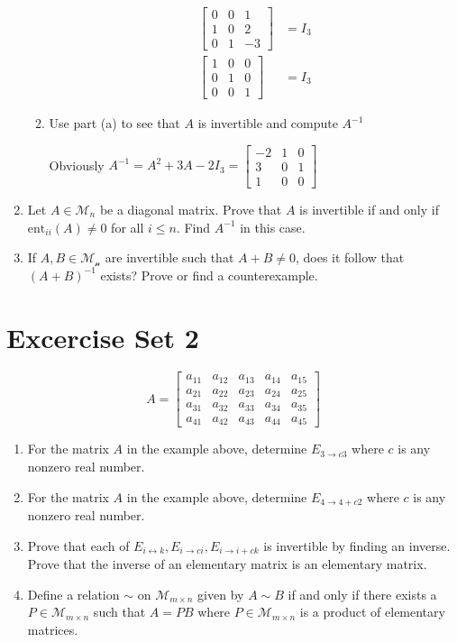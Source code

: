 \documentclass[letterpaper]{article}
\begin{document}
\begin{enumerate}
\begin{enumerate}
\begin{align*}
    \left[\begin{array}{ccc}0&0&1\\1&0&2\\0&1&-3\end{array}\right]&=I_3\\
    \left[\begin{array}{ccc}1&0&0\\0&1&0\\0&0&1\end{array}\right]&=I_3
  \end{align*}
  \item
  Use part (a) to see that $A$ is invertible and compute $A^{-1}$
  
  Obviously $A^{-1}=A^2+3A-2I_3=\left[\begin{array}{ccc}-2&1&0\\3&0&1\\1&0&0\end{array}\right]$
  \end{enumerate}
\item
Let $A\in \mathcal{M}_n$ be a diagonal matrix. Prove that $A$ is invertible if and only if $\text{ent}_{ii}(A)\ne0$ for all $i\le n$. Find $A^{-1}$ in this case.
\item
If $A,B\in \mathcal{M_n}$ are invertible such that $A+B\ne 0$, does it follow that $(A+B)^{-1}$ exists? Prove or find a counterexample.
\end{enumerate}
\section*{Excercise Set 2}

\[A=
\left[\begin{array}{ccccc}
  a_{11}&a_{12}&a_{13}&a_{14}&a_{15}\\
  a_{21}&a_{22}&a_{23}&a_{24}&a_{25}\\
  a_{31}&a_{32}&a_{33}&a_{34}&a_{35}\\
  a_{41}&a_{42}&a_{43}&a_{44}&a_{45}
\end{array}\right]\]

\begin{enumerate}
\item
For the matrix $A$ in the example above, determine $E_{3\to c3}$ where $c$ is any nonzero real number.
\item
For the matrix $A$ in the example above, determine $E_{4\to4+c2}$ where $c$ is any nonzero real number.
\item
Prove that each of $E_{i\leftrightarrow k},E_{i\to ci}, E_{i\to i+ck}$ is invertible by finding an inverse. Prove that the inverse of an elementary matrix is an elementary matrix. 
\item
Define a relation $\sim$ on $\mathcal{M}_{m\times n}$ given by $A\sim B$ if and only if there exists a $P\in \mathcal{M}_{m\times n}$ such that $A=PB$ where $P\in \mathcal{M}_{m\times n}$ is a product of elementary matrices.
\end{enumerate}
\end{document}
